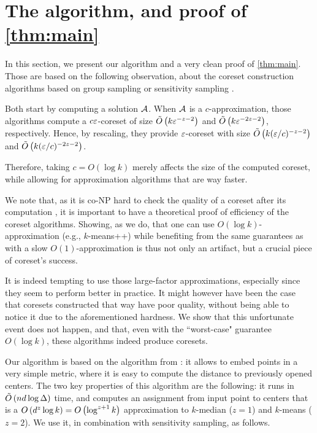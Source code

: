 \section{The algorithm, and proof of \cref{thm:main}}

In this section, we present our algorithm and a very clean proof of \cref{thm:main}. Those are based on the following observation, about the coreset construction algorithms based on group sampling \cite{stoc21} or sensitivity sampling \cite{}. 

Both start by computing a solution $\mathcal A$. When $\mathcal A$ is a $c$-approximation, those algorithms compute a $c \varepsilon$-coreset of size $\tilde O\left( k \varepsilon^{-z-2}\right)$ and $\tilde O\left( k \varepsilon^{-2z -2}\right)$, respectively. Hence, by rescaling, they provide $\varepsilon$-coreset with size $\tilde O\left( k (\varepsilon/c)^{-z-2}\right)$ and $\tilde O\left( k (\varepsilon/c)^{-2z-2}\right)$. 

Therefore, taking $c = O(\log k)$ merely affects the size of the computed coreset, while allowing for approximation algorithms that are way faster.

We note that, as it is co-NP hard to check the quality of a coreset after its computation \cite{chrisESA}, it is important to have a theoretical proof of efficiency of the coreset algorithms. 
Showing, as we do, that one can use $O(\log k)$-approximation (e.g., $k$-means++) while benefiting from the same guarantees as with a slow $O(1)$-approximation is thus not only an artifact, but a crucial piece of coreset's success. 

It is indeed tempting to use those large-factor approximations, especially since they seem to perform better in practice. 
It might however have been the case that coresets constructed that way have poor quality, without being able to notice it due to the aforementioned hardness. 
We show that this unfortunate event does not happen, and that, even with the ``worst-case" guarantee $O(\log k)$, these algorithms indeed produce coresets.


Our algorithm is based on the \fkmeans algorithm from \cite{cohen2020fast}: it allows to embed points in a very simple metric,  where it is easy to compute the distance to previously opened centers. The two key properties of this algorithm are the following: it runs in $\tilde O\left( n d \log \Delta\right)$ time, and computes an assignment from input point to centers that is a $O\left( d^z \log k\right) = O\left(\log^{z+1} k\right)$ approximation to $k$-median ($z=1$) and $k$-means ($z=2$).
We use it, in combination with sensitivity sampling, as follows.


